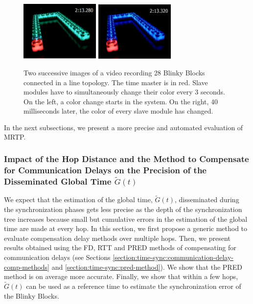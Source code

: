 \begin{figure}[h!]
	\begin{center}
		\includegraphics[width=0.35\textwidth]{images/time-synchronization/line1.png}
		\includegraphics[width=0.35\textwidth]{images/time-synchronization/line2.png}
	\end{center}
	\caption{Two successive images of a video recording 28 Blinky Blocks connected in a line topology. The time master is in red. Slave modules have to simultaneously change their color every 3 seconds. On the left, a color change starts in the system. On the right, 40 milliseconds later, the color of every slave module has changed.\label{fig:time-sync:line}}
\end{figure}

In the next subsections, we present a more precise and automated evaluation of MRTP. 

\subsubsection{Impact of the Hop Distance and the Method to Compensate for Communication Delays on the Precision of the Disseminated Global Time $\tilde{G}(t)$}
\label{section:time-sync:delay-comp-method}

We expect that the estimation of the global time, $\tilde{G}(t)$, disseminated during the synchronization phases gets less precise as the depth of the synchronization tree increases because small but cumulative errors in the estimation of the global time are made at every hop. In this section, we first propose a generic method to evaluate compensation delay methods over multiple hops. Then, we present results obtained using the FD, RTT and PRED methods of compensating for communication delays (see Sections \ref{section:time-sync:communication-delay-comp-methods} and \ref{section:time-sync:pred-method}). We show that the PRED method is on average more accurate. Finally, we show that within a few hops, $\tilde{G}(t)$ can be used as a reference time to estimate the synchronization error of the Blinky Blocks.

